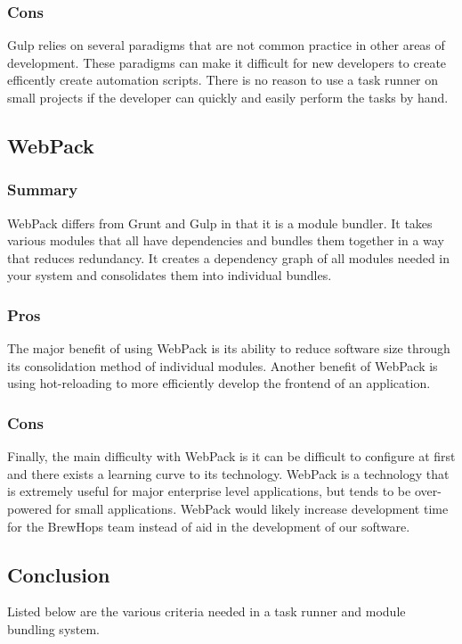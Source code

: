 \documentclass[draftclsnofoot,onecolumn,letterpaper,10pt,compsoc]{IEEEtran}
\begin{document}
		        \subsubsection{Cons}
		            Gulp relies on several paradigms that are not common practice in other areas of development.
		            These paradigms can make it difficult for new developers to create efficently create automation scripts.
		            There is no reason to use a task runner on small projects if the developer can quickly and easily perform the tasks by hand.

			\subsection{WebPack}
		        \subsubsection{Summary}
		            WebPack differs from Grunt and Gulp in that it is a module bundler.
		            It takes various modules that all have dependencies and bundles them together in a way that reduces redundancy\cite{WebPack}.
		            It creates a dependency graph of all modules needed in your system and consolidates them into individual bundles\cite{WebPack}.

		        \subsubsection{Pros}
		            The major benefit of using WebPack is its ability to reduce software size through its consolidation method of individual modules.
		            Another benefit of WebPack is using hot-reloading to more efficiently develop the frontend of an application\cite{TaskRunners}.

		        \subsubsection{Cons}
		            Finally, the main difficulty with WebPack is it can be difficult to configure at first and there exists a learning curve to its technology\cite{TaskRunners}.
		            WebPack is a technology that is extremely useful for major enterprise level applications, but tends to be over-powered for small applications.
		            WebPack would likely increase development time for the BrewHops team instead of aid in the development of our software.

		    \subsection{Conclusion}
		        Listed below are the various criteria needed in a task runner and module bundling system.
\end{document}
